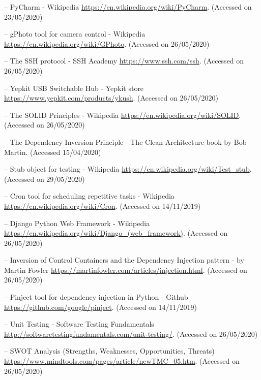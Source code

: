 \begin{thebibliography}{99999}
\singlespace\normalsize

 -- PyCharm - Wikipedia \url{https://en.wikipedia.org/wiki/PyCharm}. (Accessed on 23/05/2020)

 -- gPhoto tool for camera control - Wikipedia \url{https://en.wikipedia.org/wiki/GPhoto}. (Accessed on 26/05/2020)

 -- The SSH protocol - SSH Academy \url{https://www.ssh.com/ssh}. (Accessed on 26/05/2020)

 -- Yepkit USB Switchable Hub - Yepkit store \url{https://www.yepkit.com/products/ykush}. (Accessed on 26/05/2020)

 -- The SOLID Principles - Wikipedia \url{https://en.wikipedia.org/wiki/SOLID}. (Accessed on 26/05/2020)

 -- The Dependency Inversion Principle - The Clean Architecture book by Bob Martin. (Accessed 15/04/2020)

 -- Stub object for testing - Wikipedia \url{https://en.wikipedia.org/wiki/Test_stub}. (Accessed on 29/05/2020)

 -- Cron tool for scheduling repetitive tasks - Wikipedia \url{https://en.wikipedia.org/wiki/Cron}. (Accessed on 14/11/2019)

 -- Django Python Web Framework - Wikipedia \url{https://en.wikipedia.org/wiki/Django_(web_framework)}. (Accessed on 26/05/2020)

 -- Inversion of Control Containers and the Dependency Injection pattern - by Martin Fowler \url{https://martinfowler.com/articles/injection.html}. (Accessed on 26/05/2020)

 -- Pinject tool for dependency injection in Python - Github \url{https://github.com/google/pinject}. (Accessed on 14/11/2019)

 -- Unit Testing - Software Testing Fundamentals \url{http://softwaretestingfundamentals.com/unit-testing/}. (Accessed on 26/05/2020)

 -- SWOT Analysis (Strengths, Weaknesses, Opportunities, Threats) \url{https://www.mindtools.com/pages/article/newTMC_05.htm}. (Accessed on 26/05/2020)

\end{thebibliography}
